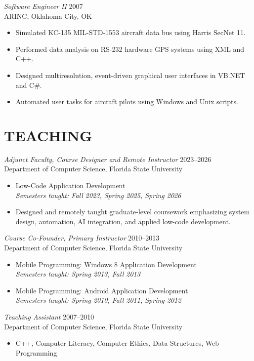 \documentclass[margin]{res}
\begin{document}
\begin{resume}
{\sl Software Engineer II} \hfill 2007\\
ARINC, Oklahoma City, OK
\begin{itemize}
\item Simulated KC-135 MIL-STD-1553 aircraft data bus using Harris SecNet 11.
\item Performed data analysis on RS-232 hardware GPS systems using XML and C++.
\item Designed multiresolution, event-driven graphical user interfaces in VB.NET and C\#.
\item Automated user tasks for aircraft pilots using Windows and Unix scripts.
\end{itemize}

\section{TEACHING}
{\sl Adjunct Faculty, Course Designer and Remote Instructor} \hfill 2023--2026\\
Department of Computer Science, Florida State University
\begin{itemize}
\item Low-Code Application Development\\
      {\small\textit{Semesters taught: Fall 2023, Spring 2025, Spring 2026}}
\item Designed and remotely taught graduate-level coursework emphasizing system design, automation, AI integration, and applied low-code development.
\end{itemize}

{\sl Course Co-Founder, Primary Instructor} \hfill 2010--2013\\
Department of Computer Science, Florida State University
\begin{itemize}
\item Mobile Programming: Windows 8 Application Development\\
      {\small\textit{Semesters taught: Spring 2013, Fall 2013}}
\item Mobile Programming: Android Application Development\\
      {\small\textit{Semesters taught: Spring 2010, Fall 2011, Spring 2012}}
\end{itemize}

{\sl Teaching Assistant} \hfill 2007--2010\\
Department of Computer Science, Florida State University
\begin{itemize}
\item C++, Computer Literacy, Computer Ethics, Data Structures, Web Programming
\end{itemize}


\end{resume}
\end{document}
